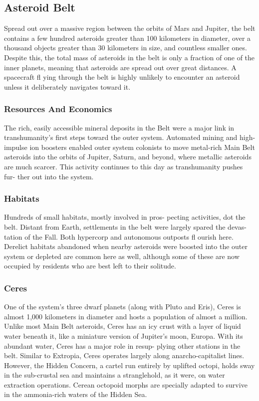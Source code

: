 \subsection{Asteroid Belt}

Spread out over a massive region between the orbits 
of Mars and Jupiter, the belt contains a few hundred 
asteroids greater than 100 kilometers in diameter, over 
a thousand objects greater than 30 kilometers in size, 
and countless smaller ones. Despite this, the total mass 
of asteroids in the belt is only a fraction of one of the 
inner planets, meaning that asteroids are spread out 
over great distances. A spacecraft fl ying through the 
belt is highly unlikely to encounter an asteroid unless 
it deliberately navigates toward it.

\subsubsection{Resources And Economics}

The rich, easily accessible mineral deposits in the 
Belt were a major link in transhumanity's first steps 
toward the outer system. Automated mining and 
high-impulse ion boosters enabled outer system 
colonists to move metal-rich Main Belt asteroids 
into the orbits of Jupiter, Saturn, and beyond, where 
metallic asteroids are much scarcer. This activity 
continues to this day as transhumanity pushes fur-
ther out into the system.

\subsubsection{Habitats}

Hundreds of small habitats, mostly involved in pros-
pecting activities, dot the belt. Distant from Earth, 
settlements in the belt were largely spared the devas-
tation of the Fall. Both hypercorp and autonomous 
outposts fl ourish here. Derelict habitats abandoned 
when nearby asteroids were boosted into the outer 
system or depleted are common here as well, although 
some of these are now occupied by residents who are 
best left to their solitude.

\subsubsection{Ceres}

One of the system's three dwarf planets (along with 
Pluto and Eris), Ceres is almost 1,000 kilometers in 
diameter and hosts a population of almost a million. 
Unlike most Main Belt asteroids, Ceres has an icy 
crust with a layer of liquid water beneath it, like a 
miniature version of Jupiter's moon, Europa. With 
its abundant water, Ceres has a major role in resup-
plying other stations in the belt. Similar to Extropia, 
Ceres operates largely along anarcho-capitalist lines. 
However, the Hidden Concern, a cartel run entirely 
by uplifted octopi, holds sway in the sub-crustal sea 
and maintains a stranglehold, as it were, on water 
extraction operations. Cerean octopoid morphs are 
specially adapted to survive in the ammonia-rich 
waters of the Hidden Sea.

